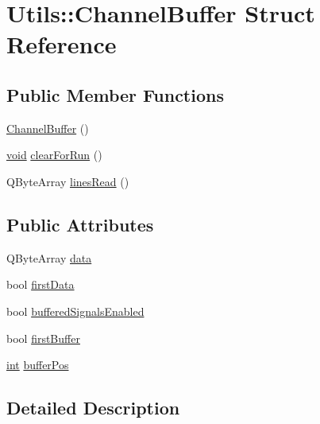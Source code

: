 \hypertarget{struct_utils_1_1_channel_buffer}{\section{Utils\-:\-:Channel\-Buffer Struct Reference}
\label{struct_utils_1_1_channel_buffer}
}
\subsection*{Public Member Functions}
\begin{DoxyCompactItemize}
\item 
\hyperlink{struct_utils_1_1_channel_buffer_a28510643b1efd9e8446e2d6c9bbfd616}{Channel\-Buffer} ()
\item 
\hyperlink{group___u_a_v_objects_plugin_ga444cf2ff3f0ecbe028adce838d373f5c}{void} \hyperlink{struct_utils_1_1_channel_buffer_ad4e57e4c3a68b76bbefafa2c8599675b}{clear\-For\-Run} ()
\item 
Q\-Byte\-Array \hyperlink{struct_utils_1_1_channel_buffer_a7a6b0e4a572dd21eb4ee4bea550cd3e5}{lines\-Read} ()
\end{DoxyCompactItemize}
\subsection*{Public Attributes}
\begin{DoxyCompactItemize}
\item 
Q\-Byte\-Array \hyperlink{struct_utils_1_1_channel_buffer_aec15c168afb035f27ef4cefc5825ac66}{data}
\item 
bool \hyperlink{struct_utils_1_1_channel_buffer_acb0128e17057f24d11abcb41acfd2da4}{first\-Data}
\item 
bool \hyperlink{struct_utils_1_1_channel_buffer_a604565db9d7f8ee949013e67140d4dbf}{buffered\-Signals\-Enabled}
\item 
bool \hyperlink{struct_utils_1_1_channel_buffer_ac695882231416a6a43841faf53242fbc}{first\-Buffer}
\item 
\hyperlink{ioapi_8h_a787fa3cf048117ba7123753c1e74fcd6}{int} \hyperlink{struct_utils_1_1_channel_buffer_aa968a408a1f0a7cfa1dc83c2ea665ef5}{buffer\-Pos}
\end{DoxyCompactItemize}


\subsection{Detailed Description}


